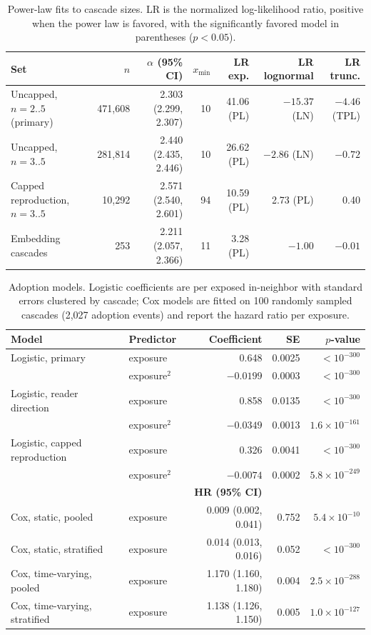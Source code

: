 \documentclass{article}
\begin{document}
\begin{table}[H]
\centering
\caption{Power-law fits to cascade sizes. LR is the normalized log-likelihood ratio, positive when the power law is favored, with the significantly favored model in parentheses ($p < 0.05$).}
\label{tab:powerlaw_fits}
\small
\begin{tabular}{@{}lrrrrrr@{}}
\toprule
\textbf{Set} & \textbf{$n$} & \textbf{$\alpha$ (95\% CI)} & \textbf{$x_{\min}$} & \textbf{LR exp.} & \textbf{LR lognormal} & \textbf{LR trunc.} \\
\midrule
Uncapped, $n=2..5$ (primary) & 471,608 & 2.303 (2.299, 2.307) & 10 & 41.06 (PL) & $-15.37$ (LN) & $-4.46$ (TPL) \\
Uncapped, $n=3..5$ & 281,814 & 2.440 (2.435, 2.446) & 10 & 26.62 (PL) & $-2.86$ (LN) & $-0.72$ \\
Capped reproduction, $n=3..5$ & 10,292 & 2.571 (2.540, 2.601) & 94 & 10.59 (PL) & 2.73 (PL) & 0.40 \\
Embedding cascades & 253 & 2.211 (2.057, 2.366) & 11 & 3.28 (PL) & $-1.00$ & $-0.01$ \\
\bottomrule
\end{tabular}
\end{table}

\begin{table}[H]
\centering
\caption{Adoption models. Logistic coefficients are per exposed in-neighbor with standard errors clustered by cascade; Cox models are fitted on 100 randomly sampled cascades (2,027 adoption events) and report the hazard ratio per exposure.}
\label{tab:adoption_models}
\small
\begin{tabular}{@{}llrrr@{}}
\toprule
\textbf{Model} & \textbf{Predictor} & \textbf{Coefficient} & \textbf{SE} & \textbf{$p$-value} \\
\midrule
Logistic, primary & exposure & 0.648 & 0.0025 & $<10^{-300}$ \\
 & exposure$^2$ & $-0.0199$ & 0.0003 & $<10^{-300}$ \\
Logistic, reader direction & exposure & 0.858 & 0.0135 & $<10^{-300}$ \\
 & exposure$^2$ & $-0.0349$ & 0.0013 & $1.6 \times 10^{-161}$ \\
Logistic, capped reproduction & exposure & 0.326 & 0.0041 & $<10^{-300}$ \\
 & exposure$^2$ & $-0.0074$ & 0.0002 & $5.8 \times 10^{-249}$ \\
\midrule
 & & \textbf{HR (95\% CI)} & & \\
Cox, static, pooled & exposure & 0.009 (0.002, 0.041) & 0.752 & $5.4 \times 10^{-10}$ \\
Cox, static, stratified & exposure & 0.014 (0.013, 0.016) & 0.052 & $<10^{-300}$ \\
Cox, time-varying, pooled & exposure & 1.170 (1.160, 1.180) & 0.004 & $2.5 \times 10^{-288}$ \\
Cox, time-varying, stratified & exposure & 1.138 (1.126, 1.150) & 0.005 & $1.0 \times 10^{-127}$ \\
\bottomrule
\end{tabular}
\end{table}
\end{document}
